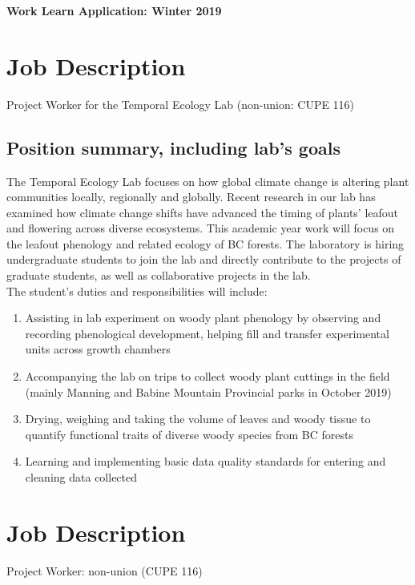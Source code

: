 \documentclass[11pt, oneside]{article}   	%
\begin{document}
\noindent \textbf{\Large{Work Learn Application: Winter 2019}}

\section {Job Description} 
Project Worker for the Temporal Ecology Lab (non-union: CUPE 116)

\subsection {Position summary, including lab's goals}
The Temporal Ecology Lab focuses on how global climate change is altering plant communities locally, regionally and globally. Recent research in our lab has examined how climate change shifts have advanced the timing of plants' leafout and flowering across diverse ecosystems. This academic year work will focus on the leafout phenology and related ecology of BC forests. The laboratory is hiring undergraduate students to join the lab and directly contribute to the projects of graduate students, as well as collaborative projects in the lab. \\

The student's duties and responsibilities will include:

\begin{enumerate}
\item Assisting in lab experiment on woody plant phenology by observing and recording phenological development, helping fill and transfer experimental units across growth chambers
\item Accompanying the lab on trips to collect woody plant cuttings in the field (mainly Manning and Babine Mountain Provincial parks in October 2019)
\item Drying, weighing and taking the volume of leaves and woody tissue to quantify functional traits of diverse woody species from BC forests
\item Learning and implementing basic data quality standards for entering and cleaning data collected
\end{enumerate}

\section {Job Description}
Project Worker: non-union (CUPE 116)
\end{document}
